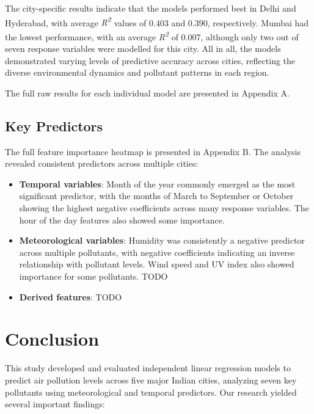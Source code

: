 \documentclass[twoside,11pt]{article}
\begin{document}
The city-specific results indicate that the models performed best in Delhi and Hyderabad, with average \textit{R\textsuperscript{2}} values of 0.403 and 0.390, respectively. Mumbai had the lowest performance, with an average \textit{R\textsuperscript{2}} of 0.007, although only two out of seven response variables were modelled for this city. All in all, the models demonstrated varying levels of predictive accuracy across cities, reflecting the diverse environmental dynamics and pollutant patterns in each region.

The full raw results for each individual model are presented in Appendix A.

\subsection{Key Predictors}

The full feature importance heatmap is presented in Appendix B. The analysis revealed consistent predictors across multiple cities:

\begin{itemize}
  \item \textbf{Temporal variables}: Month of the year commonly emerged as the most significant predictor, with the months of March to September or October showing the highest negative coefficients across many response variables. The hour of the day features also showed some importance.
  \item \textbf{Meteorological variables}: Humidity was consistently a negative predictor across multiple pollutants, with negative coefficients indicating an inverse relationship with pollutant levels. Wind speed and UV index also showed importance for some pollutants. TODO
  \item \textbf{Derived features}: TODO
\end{itemize}

\section{Conclusion}

This study developed and evaluated independent linear regression models to predict air pollution levels across five major Indian cities, analyzing seven key pollutants using meteorological and temporal predictors. Our research yielded several important findings:
\end{document}
